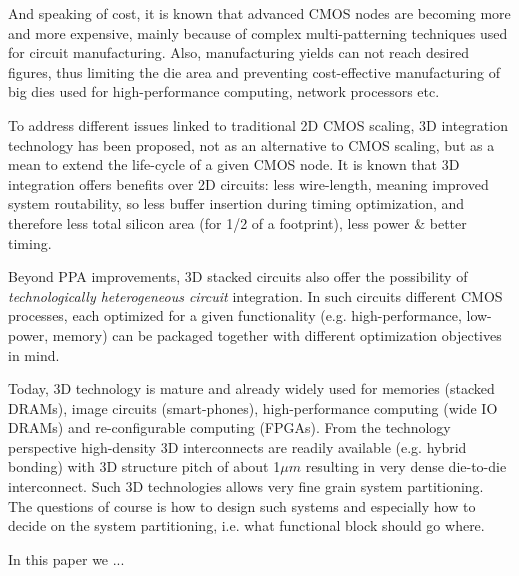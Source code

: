 \documentclass[conference]{IEEEtran}
\begin{document}
And speaking of cost, it is known that advanced CMOS nodes are becoming more and more expensive, mainly because of complex multi-patterning techniques used for circuit manufacturing. Also, manufacturing yields can not reach desired figures, thus limiting the die area and preventing cost-effective manufacturing of big dies used for high-performance computing, network processors etc. 

To address different issues linked to traditional 2D CMOS scaling, 3D integration technology has been proposed, not as an alternative to CMOS scaling, but as a mean to extend the life-cycle of a given CMOS node. It is known that 3D integration offers benefits over 2D circuits: less wire-length, meaning improved system routability, so less buffer insertion during timing optimization, and therefore less total silicon area (for 1/2 of a footprint), less power \& better timing. 

Beyond PPA improvements, 3D stacked circuits also offer the possibility of \emph{technologically heterogeneous circuit} integration. In such circuits different CMOS processes, each optimized for a given functionality (e.g. high-performance, low-power, memory) can be packaged together with different optimization objectives in mind. 

Today, 3D technology is mature and already widely used for memories (stacked DRAMs), image circuits (smart-phones), high-performance computing (wide IO DRAMs) and re-configurable computing (FPGAs). From the technology perspective high-density 3D interconnects are readily available (e.g. hybrid bonding) with 3D structure pitch of about 1$\mu m$ resulting in very dense die-to-die interconnect. Such 3D technologies allows very fine grain system partitioning. The questions of course is how to design such systems and especially how to decide on the system partitioning, i.e. what functional block should go where. 

In this paper we ... 

\end{document}
